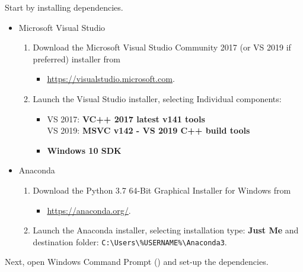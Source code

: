 \noindent Start by installing \escript dependencies.

\begin{itemize}
\item Microsoft Visual Studio
\begin{enumerate}
\item Download the Microsoft Visual Studio Community 2017 (or VS 2019 if
preferred) installer from
\begin{itemize}
\item[] \url{https://visualstudio.microsoft.com}.
\end{itemize}
\item Launch the Visual Studio installer, selecting Individual components:
\begin{itemize}
\item VS 2017: \textbf{VC++ 2017 latest v141 tools} \\
VS 2019: \textbf{MSVC v142 - VS 2019 C++ build tools}
\item \textbf{Windows 10 SDK}
\end{itemize}
\end{enumerate}
\item Anaconda
\begin{enumerate}
\item Download the Python 3.7 64-Bit Graphical Installer for Windows from
\begin{itemize}
\item[] \url{https://anaconda.org/}.
\end{itemize}
\item Launch the Anaconda installer, selecting installation type: \textbf{Just
Me} and destination folder: \newline \verb!C:\Users\%USERNAME%\Anaconda3!.
\end{enumerate}
\end{itemize}

\noindent Next, open Windows Command Prompt () and set-up the
\escript dependencies.

